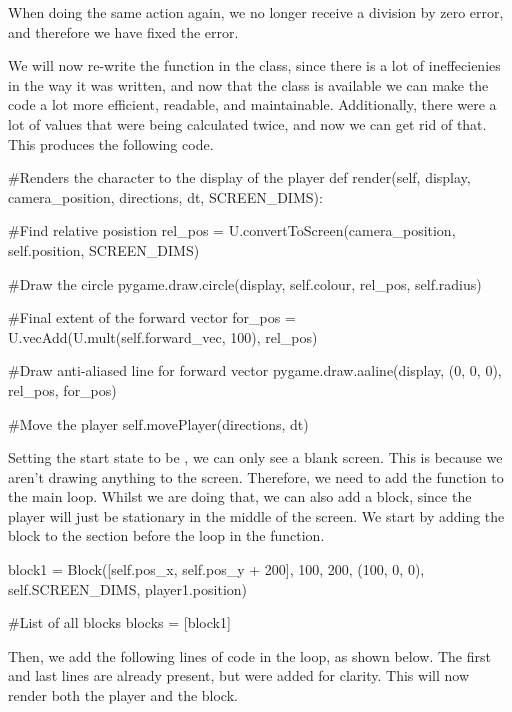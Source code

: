 When doing the same action again, we no longer receive a division by zero error, and therefore we have fixed the error.

\vs
We will now re-write the  function in the  class, since there is a lot of ineffecienies in the way it was written, and now that the  class is available we can make the code a lot more efficient, readable, and maintainable. Additionally, there were a lot of values that were being calculated twice, and now we can get rid of that. This produces the following code.
\vs

\begin{mpy}
    #Renders the character to the display of the player
    def render(self, display, camera_position, directions, dt, SCREEN_DIMS):

        #Find relative posistion
        rel_pos = U.convertToScreen(camera_position, self.position, SCREEN_DIMS)

        #Draw the circle
        pygame.draw.circle(display, self.colour, rel_pos, self.radius)

        #Final extent of the forward vector
        for_pos = U.vecAdd(U.mult(self.forward_vec, 100), rel_pos)

        #Draw anti-aliased line for forward vector
        pygame.draw.aaline(display, (0, 0, 0), rel_pos, for_pos)

        #Move the player
        self.movePlayer(directions, dt)
\end{mpy}



Setting the start state to be , we can only see a blank screen. This is because we aren't drawing anything to the screen. Therefore, we need to add the  function to the main loop. Whilst we are doing that, we can also add a block, since the player will just be stationary in the middle of the screen. We start by adding the block to the section before the  loop in the  function.

\begin{mpy}
        block1 = Block([self.pos_x, self.pos_y + 200], 100, 200, (100, 0, 0), self.SCREEN_DIMS, player1.position)

        #List of all blocks
        blocks = [block1]
\end{mpy}

Then, we add the following lines of code in the  loop, as shown below. The first and last lines are already present, but were added for clarity. This will now render both the player and the block.

